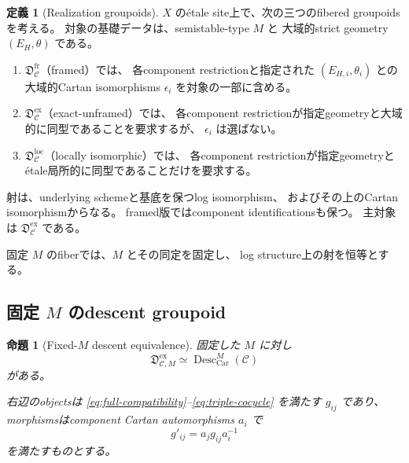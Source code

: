 \documentclass[uplatex,dvipdfmx,11pt]{jsarticle}
\numberwithin{equation}{section}
\theoremstyle{plain}
\newtheorem{proposition}[theorem]{命題}
\theoremstyle{definition}
\newtheorem{definition}[theorem]{定義}
\theoremstyle{remark}
\DeclareMathOperator{\Desc}{Desc}
\newcommand{\Car}{\mathrm{Car}}
\newcommand{\calC}{\mathcal C}
\newcommand{\calD}{\mathfrak D}
\begin{document}
\begin{definition}[Realization groupoids]
\label{def:realization-groupoids}
\(X\) のétale site上で、次の三つのfibered groupoidsを考える。
対象の基礎データは、semistable-type \(M\) と
大域的strict geometry \((E_H,\theta)\) である。

\begin{enumerate}
\item
\(\calD_{\calC}^{\mathrm{fr}}\)（framed）では、
各component restrictionと指定された \((E_{H,i},\theta_i)\) との
大域的Cartan isomorphisms \(\epsilon_i\) を対象の一部に含める。

\item
\(\calD_{\calC}^{\mathrm{ex}}\)（exact-unframed）では、
各component restrictionが指定geometryと大域的に同型であることを要求するが、
\(\epsilon_i\) は選ばない。

\item
\(\calD_{\calC}^{\mathrm{loc}}\)（locally isomorphic）では、
各component restrictionが指定geometryとétale局所的に同型であることだけを要求する。
\end{enumerate}

射は、underlying schemeと基底を保つlog isomorphism、
およびその上のCartan isomorphismからなる。
framed版ではcomponent identificationsも保つ。
主対象は \(\calD_{\calC}^{\mathrm{ex}}\) である。

固定 \(M\) のfiberでは、\(M\) とその同定を固定し、
log structure上の射を恒等とする。
\end{definition}

\subsection{\texorpdfstring{固定 \(M\)}{固定 M} のdescent groupoid}

\begin{proposition}[Fixed-\(M\) descent equivalence]
\label{prop:descent-groupoid}
固定した \(M\) に対し
\begin{equation}
\label{eq:groupoid-equivalence}
\calD_{\calC,M}^{\mathrm{ex}}
\simeq\Desc_{\Car}^M(\calC)
\end{equation}
がある。

右辺のobjectsは
\eqref{eq:full-compatibility}--\eqref{eq:triple-cocycle}
を満たす \(g_{ij}\) であり、
morphismsはcomponent Cartan automorphisms \(a_i\) で
\begin{equation}
\label{eq:vertex-morphism}
g'_{ij}=a_jg_{ij}a_i^{-1}
\end{equation}
を満たすものとする。
\end{proposition}
\end{document}
